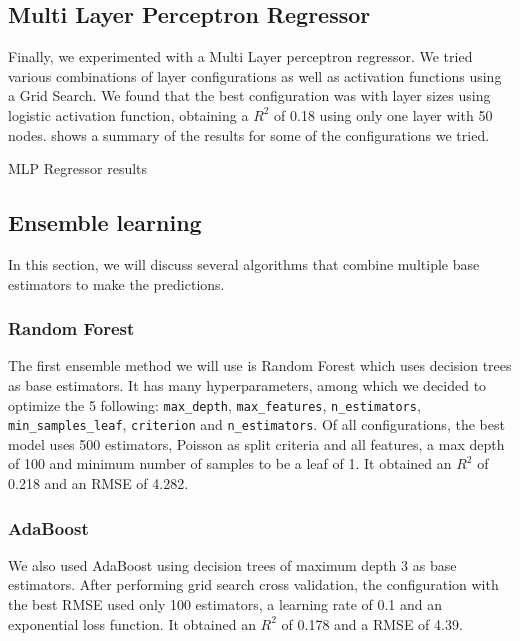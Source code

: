 \subsection{Multi Layer Perceptron Regressor}%
\label{sub:mlpreg}

Finally, we experimented with a Multi Layer perceptron regressor. We tried various combinations
of layer configurations as well as activation functions using a Grid Search. We found
that the best configuration was with layer sizes using logistic activation function,
obtaining a $R^2$ of 0.18 using only one layer with 50 nodes.  shows a summary
of the results for some of the configurations we tried.

\begin{table}[H]
\caption{MLP Regressor results}%
\label{tab:mlpr}

\end{table}

\subsection{Ensemble learning}%
\label{ssub:ensemble}

In this section, we will discuss several algorithms that combine multiple base estimators to make the predictions.

\subsubsection{Random Forest}
The first ensemble method we will use is Random Forest which uses decision trees as base estimators. It has many hyperparameters, among which we decided to optimize the 5 following: \texttt{max\_depth}, \texttt{max\_features}, \texttt{n\_estimators}, \texttt{min\_samples\_leaf}, \texttt{criterion} and \texttt{n\_estimators}. Of all configurations, the best model uses 500 estimators, Poisson as split criteria and all features, a max depth of 100 and minimum number of samples to be a leaf of 1. It obtained an $R^2$ of 0.218 and an RMSE of 4.282.

\subsubsection{AdaBoost}
We also used AdaBoost using decision trees of maximum depth 3 as base estimators. After performing grid search cross validation, the configuration with the best RMSE used only 100 estimators, a learning rate of 0.1 and  an exponential loss function. It obtained an $R^2$ of 0.178 and a RMSE of 4.39.	  

